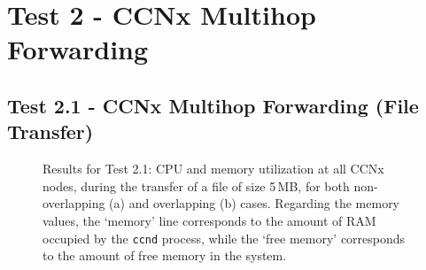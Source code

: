 \section{Test 2 - CCNx Multihop Forwarding}
\label{app:res-multihop-for}

\subsection{Test 2.1 - CCNx Multihop Forwarding (File Transfer)}
\label{subapp:test-multihop-file}

\begin{figure}[H]
    \centering



    \cprotect\caption{Results for Test 2.1: CPU and memory utilization at 
        all CCNx nodes, during the transfer of a file of size 
        5\,MB, for both non-overlapping (a) and overlapping (b) cases. Regarding the 
        memory values, the `memory' line corresponds to the amount of RAM 
        occupied by the \verb+ccnd+ process, while the `free memory' corresponds 
        to the amount of free memory in the system.}
    \label{fig:file_5-cpu-mem}

\end{figure}

